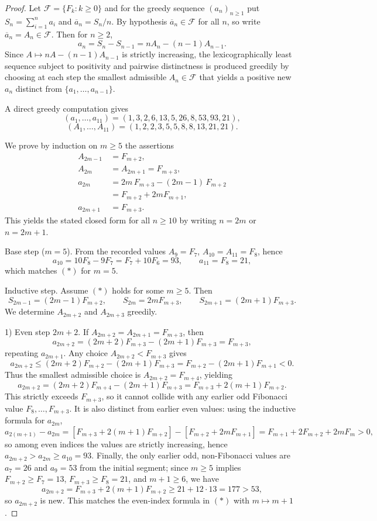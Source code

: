 \begin{proof}
Let $\mathcal F=\{F_k:k\ge0\}$ and for the greedy sequence $(a_n)_{n\ge1}$ put $S_n=\sum_{i=1}^n a_i$ and $\overline a_n=S_n/n$. By hypothesis $\overline a_n\in\mathcal F$ for all $n$, so write $\overline a_n=A_n\in\mathcal F$. Then for $n\ge2$,
$$
 a_n=S_n-S_{n-1}=nA_n-(n-1)A_{n-1}.
$$
Since $A\mapsto nA-(n-1)A_{n-1}$ is strictly increasing, the lexicographically least sequence subject to positivity and pairwise distinctness is produced greedily by choosing at each step the smallest admissible $A_n\in\mathcal F$ that yields a positive new $a_n$ distinct from $\{a_1,\dots,a_{n-1}\}$.

A direct greedy computation gives
$$(a_1,\dots,a_{11})=(1,3,2,6,13,5,26,8,53,93,21),$$
$$(A_1,\dots,A_{11})=(1,2,2,3,5,5,8,8,13,21,21).$$

We prove by induction on $m\ge5$ the assertions
\[
\begin{aligned}
A_{2m-1}\,&=F_{m+2},\\
A_{2m}\,&=A_{2m+1}=F_{m+3},\\
a_{2m}\,&=2m\,F_{m+3}-(2m-1)\,F_{m+2}\\
\,&=F_{m+2}+2mF_{m+1},\\
a_{2m+1}\,&=F_{m+3}.
\end{aligned}
\]
This yields the stated closed form for all $n\ge10$ by writing $n=2m$ or $n=2m+1$.

Base step ($m=5$). From the recorded values $A_9=F_7$, $A_{10}=A_{11}=F_8$, hence
$$a_{10}=10F_8-9F_7=F_7+10F_6=93,\qquad a_{11}=F_8=21,$$
which matches $(\ast)$ for $m=5$.

Inductive step. Assume $(\ast)$ holds for some $m\ge5$. Then
$$
S_{2m-1}=(2m-1)F_{m+2},\qquad S_{2m}=2mF_{m+3},\qquad S_{2m+1}=(2m+1)F_{m+3}.
$$
We determine $A_{2m+2}$ and $A_{2m+3}$ greedily.

1) Even step $2m+2$. If $A_{2m+2}=A_{2m+1}=F_{m+3}$, then
$$a_{2m+2}=(2m+2)F_{m+3}-(2m+1)F_{m+3}=F_{m+3},$$
repeating $a_{2m+1}$. Any choice $A_{2m+2}<F_{m+3}$ gives
$$a_{2m+2}\le(2m+2)F_{m+2}-(2m+1)F_{m+3}=F_{m+2}-(2m+1)F_{m+1}<0.$$
Thus the smallest admissible choice is $A_{2m+2}=F_{m+4}$, yielding
$$
 a_{2m+2}=(2m+2)F_{m+4}-(2m+1)F_{m+3}=F_{m+3}+2(m+1)F_{m+2}.
$$
This strictly exceeds $F_{m+3}$, so it cannot collide with any earlier odd Fibonacci value $F_8,\dots,F_{m+3}$. It is also distinct from earlier even values: using the inductive formula for $a_{2m}$,
$$
 a_{2(m+1)}-a_{2m}=[F_{m+3}+2(m+1)F_{m+2}]-[F_{m+2}+2mF_{m+1}]
 =F_{m+1}+2F_{m+2}+2mF_m>0,
$$
so among even indices the values are strictly increasing, hence $a_{2m+2}>a_{2m}\ge a_{10}=93$. Finally, the only earlier odd, non-Fibonacci values are $a_7=26$ and $a_9=53$ from the initial segment; since $m\ge5$ implies $F_{m+2}\ge F_7=13$, $F_{m+3}\ge F_8=21$, and $m+1\ge6$, we have
$$
 a_{2m+2}=F_{m+3}+2(m+1)F_{m+2}\ge 21+12\cdot13=177>53,
$$
so $a_{2m+2}$ is new. This matches the even-index formula in $(\ast)$ with $m\mapsto m+1$.


\end{proof}
